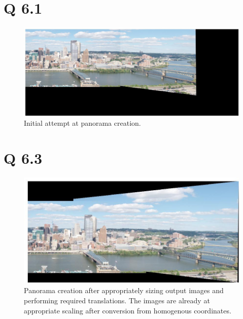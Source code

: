 \documentclass[11pt]{article}
\begin{document}
\section*{Q 6.1}
\begin{figure}[H]
\centering
\includegraphics[width=\textwidth]{results/6_1.jpg}
\caption{Initial attempt at panorama creation.}
\end{figure}
\section*{Q 6.3}
\begin{figure}[H]
\centering
\includegraphics[width=\textwidth]{results/q6_3.jpg}
\caption{Panorama creation after appropriately sizing output images and performing required
translations. The images are already at appropriate scaling after conversion from homogenous 
coordinates.}
\end{figure}
\end{document}
